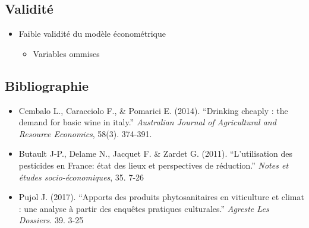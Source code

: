 \documentclass[11pt,]{article}
\providecommand{\tightlist}{%
  \setlength{\itemsep}{0pt}\setlength{\parskip}{0pt}}
\begin{document}
\FloatBarrier

\hypertarget{validite}{%
\subsection{Validité}\label{validite}}

\begin{itemize}
\tightlist
\item
  Faible validité du modèle économétrique

  \begin{itemize}
  \tightlist
  \item
    Variables ommises
  \end{itemize}
\end{itemize}

\FloatBarrier

\hypertarget{bibliographie}{%
\subsection{Bibliographie}\label{bibliographie}}

\begin{itemize}
\tightlist
\item
  Cembalo L., Caracciolo F., \& Pomarici E. (2014). ``Drinking cheaply :
  the demand for basic wine in italy.'' \emph{Australian Journal of
  Agricultural and Resource Economics}, 58(3). 374-391.
\item
  Butault J-P., Delame N., Jacquet F. \& Zardet G. (2011).
  ``L'utilisation des pesticides en France: état des lieux et
  perspectives de réduction.'' \emph{Notes et études socio-économiques},
  35. 7-26
\item
  Pujol J. (2017). ``Apports des produits phytosanitaires en viticulture
  et climat : une analyse à partir des enquêtes pratiques culturales.''
  \emph{Agreste Les Dossiers}. 39. 3-25
\end{itemize}
\end{document}
